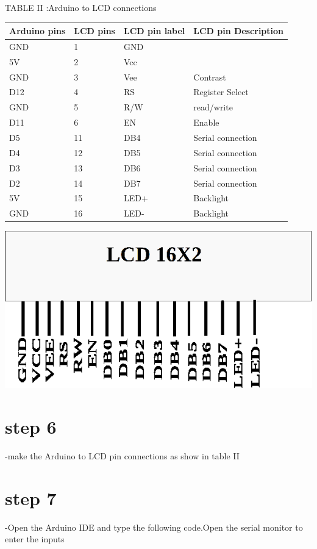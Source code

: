 \documentclass[twocolumn,13pt]{article}
\begin{document}
\begin{center}
    TABLE II :Arduino to LCD connections
\end{center}
 \begin{tabular}{ |p{1.5cm}|p{1.5cm}|p{1.5cm}|p{1.5cm}| }
 \hline
 \setlength{\tabcolsep}{3pt}
Arduino pins & LCD pins & LCD pin label & LCD pin Description\\
\hline
 GND & 1& GND & \\
 \hline
 5V & 2 & Vcc &\\
 \hline
 GND & 3 & Vee & Contrast\\
 \hline
 D12 & 4 & RS & Register Select\\
 \hline
 GND & 5 & R/W & read/write\\
 \hline
 D11 & 6 & EN &Enable\\
 \hline
 D5 & 11 & DB4 & Serial connection\\
 \hline
 D4 & 12 & DB5 & Serial connection\\
 \hline
 D3 & 13 & DB6 & Serial connection\\
 \hline
 D2 & 14 & DB7 & Serial connection\\
 \hline
 5V & 15 & LED+ & Backlight\\
 \hline
 GND & 16 & LED- & Backlight\\
 \hline
\end{tabular}



 
 

\includegraphics[scale=0.3]{figs/lcd.png} 




\section*{step 6}
-make the Arduino to LCD pin connections as show in  table II
\section*{step 7}
-Open the Arduino IDE and type the following code.Open the serial monitor to enter the inputs
\end{document}
